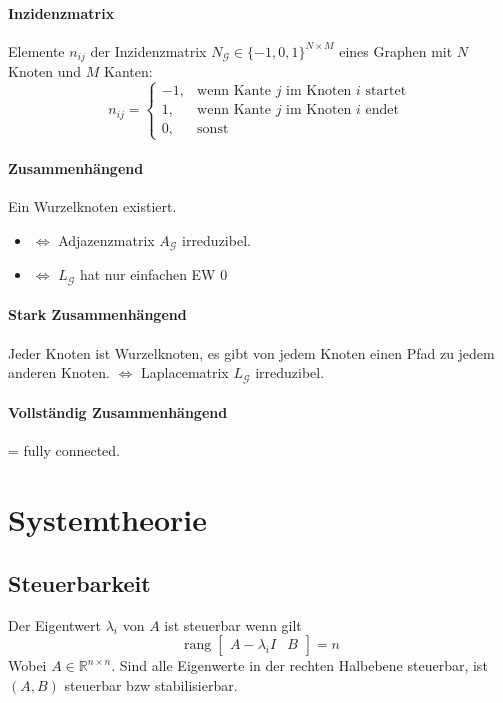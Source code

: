 \paragraph{Inzidenzmatrix}
Elemente $n_{ij}$ der Inzidenzmatrix $N_\mathcal{G} \in \{-1,0,1\}^{N \times M}$ eines Graphen mit $N$ Knoten und $M$ Kanten:
\begin{equation}
    n_{ij} = \begin{cases}
        -1, & \text{wenn Kante $j$ im Knoten $i$ startet} \\
        1,  & \text{wenn Kante $j$ im Knoten $i$ endet} \\
        0,  & \text{sonst}
    \end{cases}
\end{equation}

\paragraph{Zusammenhängend}
Ein Wurzelknoten existiert.
\begin{itemize}
    \item $\iff$ Adjazenzmatrix $A_\mathcal{G}$ irreduzibel.
    \item $\iff$ $L_\mathcal{G}$ hat nur einfachen EW 0
\end{itemize}


\paragraph{Stark Zusammenhängend}
Jeder Knoten ist Wurzelknoten, es gibt von jedem Knoten einen Pfad zu
jedem anderen Knoten.
$\iff$ Laplacematrix $L_\mathcal{G}$ irreduzibel.


\paragraph{Vollständig Zusammenhängend}
= fully connected.


\section{Systemtheorie}

\subsection{Steuerbarkeit}
\label{sec:steuerbar}
Der Eigentwert $\lambda_i$ von $A$ ist steuerbar wenn gilt
\begin{equation}
    \operatorname{rang}\begin{bmatrix}
        A-\lambda_i I & B
    \end{bmatrix} = n
\end{equation}
Wobei $A \in \mathbb{R}^{n\times n}$.
Sind alle Eigenwerte in der rechten Halbebene steuerbar, ist $(A, B)$
steuerbar bzw stabilisierbar.

